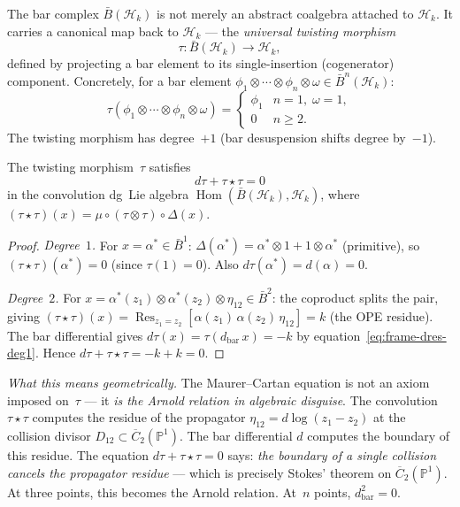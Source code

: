 The bar complex $\bar{B}(\mathcal{H}_k)$ is not merely an
abstract coalgebra attached to $\mathcal{H}_k$.  It carries a
canonical map back to $\mathcal{H}_k$ --- the \emph{universal
twisting morphism}
\begin{equation}\label{eq:frame-twisting-morphism}
\tau\colon \bar{B}(\mathcal{H}_k) \longrightarrow \mathcal{H}_k,
\end{equation}
defined by projecting a bar element to its single-insertion
(cogenerator) component.  Concretely, for a bar element
$\phi_1 \otimes \cdots \otimes \phi_n \otimes \omega
\in \bar{B}^n(\mathcal{H}_k)$:
\begin{equation}\label{eq:frame-tau-formula}
\tau(\phi_1 \otimes \cdots \otimes \phi_n \otimes \omega)
= \begin{cases}
  \phi_1 & n = 1,\;\omega = 1, \\[2pt]
  0 & n \geq 2.
\end{cases}
\end{equation}
The twisting morphism has degree~$+1$
(bar desuspension shifts degree by~$-1$).

\begin{proposition}
\label{prop:frame-twisting-MC}
The twisting morphism~$\tau$ satisfies
\begin{equation}\label{eq:frame-MC}
d\tau + \tau \star \tau = 0
\end{equation}
in the convolution dg~Lie algebra
$\operatorname{Hom}(\bar{B}(\mathcal{H}_k), \mathcal{H}_k)$,
where $(\tau \star \tau)(x)
= \mu \circ (\tau \otimes \tau) \circ \Delta(x)$.
\end{proposition}

\begin{proof}
\emph{Degree~$1$.}
For $x = \alpha^* \in \bar{B}^1$:
$\Delta(\alpha^*) = \alpha^* \otimes 1
+ 1 \otimes \alpha^*$ (primitive), so
$(\tau \star \tau)(\alpha^*) = 0$ (since $\tau(1) = 0$).
Also $d\tau(\alpha^*) = d(\alpha) = 0$.

\emph{Degree~$2$.}
For $x = \alpha^*(z_1) \otimes \alpha^*(z_2) \otimes \eta_{12}
\in \bar{B}^2$: the coproduct splits the pair, giving
$(\tau \star \tau)(x)
= \operatorname{Res}_{z_1 = z_2}
  [\alpha(z_1)\,\alpha(z_2)\,\eta_{12}]
= k$
(the OPE residue).
The bar differential gives
$d\tau(x) = \tau(d_{\mathrm{bar}}\,x) = -k$ by
equation~\eqref{eq:frame-dres-deg1}.
Hence $d\tau + \tau \star \tau = -k + k = 0$.
\end{proof}

\emph{What this means geometrically.}
The Maurer--Cartan equation is not an axiom imposed on~$\tau$
--- it \emph{is the Arnold relation in algebraic disguise}.
The convolution $\tau \star \tau$ computes the residue of the
propagator $\eta_{12} = d\log(z_1 - z_2)$ at the collision
divisor $D_{12} \subset \overline{C}_2(\mathbb{P}^1)$.
The bar differential $d$ computes the boundary of this
residue.  The equation $d\tau + \tau \star \tau = 0$ says:
\emph{the boundary of a single collision cancels the
propagator residue} --- which is precisely Stokes' theorem
on $\overline{C}_2(\mathbb{P}^1)$.  At three points, this
becomes the Arnold relation.  At~$n$ points,
$d_{\mathrm{bar}}^2 = 0$.

